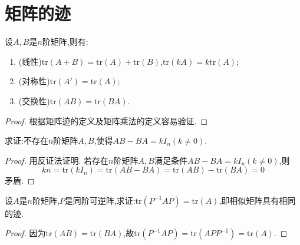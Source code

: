 \documentclass[../../main.tex]{subfiles}%
\begin{document}
\section{矩阵的迹}

\begin{proposition}[矩阵迹的性质]\label{proposition:矩阵矩阵迹的性质}
设\(A,B\)是\(n\)阶矩阵,则有:
\begin{enumerate}
\item (线性)\(\mathrm{tr}(A + B)=\mathrm{tr}(A)+\mathrm{tr}(B)\),\(\mathrm{tr}(kA)=k\mathrm{tr}(A)\);
\item (对称性)\(\mathrm{tr}(A')=\mathrm{tr}(A)\);
\item (交换性)\(\mathrm{tr}(AB)=\mathrm{tr}(BA)\).
\end{enumerate}
\end{proposition}
\begin{proof}

根据矩阵迹的定义及矩阵乘法的定义容易验证.

\end{proof}

\begin{example}
求证:不存在\(n\)阶矩阵\(A,B\),使得\(AB - BA = kI_n(k\neq0)\).
\end{example}
\begin{proof}

用反证法证明. 若存在\(n\)阶矩阵\(A,B\)满足条件\(AB - BA = kI_n(k\neq0)\),则
\[
kn=\mathrm{tr}(kI_n)=\mathrm{tr}(AB - BA)=\mathrm{tr}(AB)-\mathrm{tr}(BA)=0
\]
矛盾.

\end{proof}

\begin{proposition}
设\(A\)是\(n\)阶矩阵,\(P\)是同阶可逆阵,求证:\(\mathrm{tr}(P^{-1}AP)=\mathrm{tr}(A)\),即相似矩阵具有相同的迹.
\end{proposition}
\begin{proof}

因为\(\mathrm{tr}(AB)=\mathrm{tr}(BA)\),故\(\mathrm{tr}(P^{-1}AP)=\mathrm{tr}(APP^{-1})=\mathrm{tr}(A)\).

\end{proof}
\end{document}
